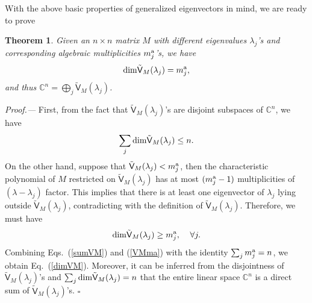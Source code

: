 \documentclass{tADP2e}
\theoremstyle{plain}
\theoremstyle{plain}
\newtheorem{theorem}{Theorem}[section]
\theoremstyle{definition}
\begin{document}
\begin{appendices}
With the above basic properties of generalized eigenvectors in mind, we are ready to prove
\begin{theorem}
Given an $n\times n$ matrix $M$ with different eigenvalues $\lambda_j$'s and corresponding algebraic multiplicities $m^{\rm a}_j$'s, we have 
\begin{equation}
{\rm dim}\tilde{\textsf{V}}_M(\lambda_j)=m^{\rm a}_j, 
\label{dimVM}
\end{equation}
and thus $\mathbb{C}^n=\bigoplus_j \tilde{\textsf{V}}_M(\lambda_j)$.
\label{dimtildeVj}
\end{theorem}
\emph{Proof.---} First, from the fact that $\tilde{\textsf{V}}_M(\lambda_j)$'s are disjoint subspaces of $\mathbb{C}^n$, we have
\begin{equation}
\sum_j{\rm dim}\tilde{\textsf{V}}_M(\lambda_j)\le n.
\label{sumVM}
\end{equation}
On the other hand, suppose that $\tilde{\textsf{V}}_M(\lambda_j)<m^{\rm a}_j$, then the characteristic polynomial of $M$ restricted on $\tilde{\textsf{V}}_M(\lambda_j)$ has at most $(m^{\rm a}_j-1)$ multiplicities of $(\lambda-\lambda_j)$ factor. This implies that there is at least one eigenvector of $\lambda_j$ lying outside $\tilde{\textsf{V}}_M(\lambda_j)$, contradicting with the definition of $\tilde{\textsf{V}}_M(\lambda_j)$. Therefore, we must have
\begin{equation}
{\rm dim}\tilde{\textsf{V}}_M(\lambda_j)\ge m^{\rm a}_j,\;\;\;\;\forall j.
\label{VMma}
\end{equation}
Combining Eqs.~(\ref{sumVM}) and (\ref{VMma}) with the identity $\sum_jm^{\rm a}_j=n$, we obtain Eq.~(\ref{dimVM}). Moreover, it can be inferred from the disjointness of $\tilde{\textsf{V}}_M(\lambda_j)$'s and $\sum_j{\rm dim}\tilde{\textsf{V}}_M(\lambda_j)=n$ that the entire linear space $\mathbb{C}^n$ is a direct sum of $\tilde{\textsf{V}}_M(\lambda_j)$'s. $\square$ 



\end{appendices}
\end{document}
